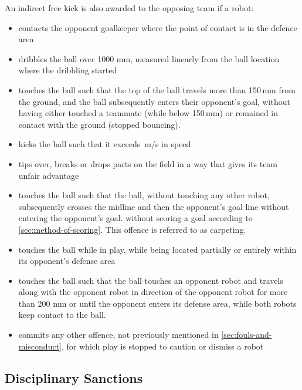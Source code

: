 An indirect free kick is also awarded to the opposing team if a robot:
\begin{itemize}
\item contacts the opponent goalkeeper where the point of contact is in the defence area
\item dribbles the ball over 1000 mm, measured linearly from the ball location where the
dribbling started
\item touches the ball such that the top of the ball travels more than 150\,mm from the ground, and the ball subsequently enters their opponent's goal, without having either touched a teammate (while below 150\,mm) or remained in contact with the ground (stopped bouncing).
\item kicks the ball such that it exceeds  \,m/s in  speed 
\item tips over, breaks or drops parts on the field in a way that gives its team unfair advantage
\item touches the ball such that the ball, without touching any other
  robot, subsequently crosses the  midline and then the opponent's goal line
  without entering the opponent's goal.
  without scoring a goal according to \autoref{sec:method-of-scoring}. This offence is referred to as carpeting.
\item touches the ball while in play, while being located partially or
entirely within its opponent's defense area
\item touches the ball such that the ball touches an opponent robot and travels along with the opponent robot in direction of the
opponent robot for more than 200 mm or until the opponent enters its defense area, while both robots keep contact to the ball.
\item commits any other offence, not previously mentioned in \autoref{sec:fouls-and-misconduct}, for which play is stopped to caution or dismiss a robot
\end{itemize}

\subsection{Disciplinary Sanctions}\label{subsec:fouls-and-misconduct-disciplinary-sanctions}
